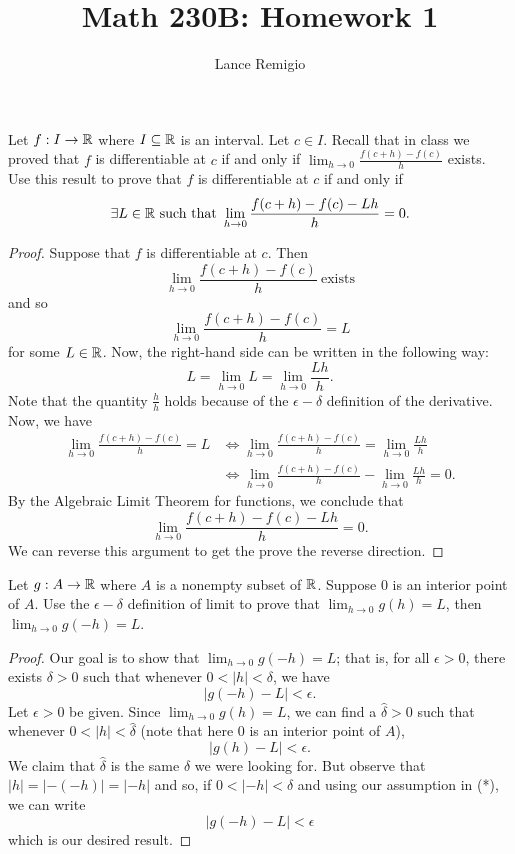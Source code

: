 \documentclass[a4paper]{article}
\title{Math 230B: Homework 1}
\author{Lance Remigio}
\begin{document}
\maketitle

\begin{problem}
   Let \( f: I \to \mathbb{R}  \) where \( I \subseteq  \mathbb{R}   \) is an interval. Let \( c \in I  \). Recall that in class we proved that \( f  \) is differentiable at \( c  \) if and only if \( \displaystyle \lim_{ h \to 0 } \frac{ f(c+h)  - f(c) }{ h }  \) exists. Use this result to prove that \( f  \) is differentiable at \( c  \) if and only if  
   \[  \exists L \in \R \ \text{such that} \ \lim_{ h \to 0 } \frac{ f(c+h) - f(c) - Lh }{ h } = 0. \]
\end{problem}
\begin{proof}
Suppose that \( f  \) is differentiable at \( c  \). Then
\[  \lim_{ h \to 0 }  \frac{ f(c+h) - f(c) }{ h  } \ \text{exists}    \]
and so 
\[  \lim_{ h \to 0 }  \frac{ f(c+h) - f(c) }{ h  } = L  \]
for some \( L \in \mathbb{R}  \). Now, the right-hand side can be written in the following way:
\[  L = \lim_{ h \to 0 }  L = \lim_{ h \to 0 }   \frac{ L h }{ h }.  \]
Note that the quantity \( \frac{ h }{ h }  \) holds because of the \( \epsilon-\delta \) definition of the derivative. Now, we have 
\begin{align*}
    \lim_{ h \to 0 }  \frac{ f(c+h) - f(c) }{ h   } = L  &\iff \lim_{ h \to 0 }  \frac{ f(c+h) - f(c) }{ h  } = \lim_{ h \to 0 } \frac{L h }{ h }  \\
                                                         &\iff \lim_{ h \to 0 }  \frac{ f(c+h) - f(c) }{ h }  - \lim_{ h \to 0 } \frac{ Lh  }{ h } = 0.
\end{align*}
By the Algebraic Limit Theorem for functions, we conclude that 
\[  \lim_{ h \to 0 } \frac{ f(c+h) - f(c) - Lh }{ h } = 0. \]
We can reverse this argument to get the prove the reverse direction.
\end{proof}

\begin{problem}
    Let \( g: A \to \mathbb{R}  \) where \( A  \) is a nonempty subset of \( \mathbb{R}  \). Suppose \( 0  \) is an interior point of \( A  \). Use the \( \epsilon-\delta \) definition of limit to prove that \( \lim_{ h \to 0 }  g(h) = L  \), then \( \lim_{ h \to 0 }  g(-h) = L  \). 
\end{problem}
\begin{proof}
Our goal is to show that \( \lim_{ h \to 0 }  g(-h) = L \); that is, for all \( \epsilon > 0  \), there exists \( \delta > 0  \) such that whenever \( 0 < | h  |  < \delta \), we have 
\[  | g(-h) - L  |  < \epsilon. \]
Let \( \epsilon > 0  \) be given. Since \( \lim_{ h \to 0 } g(h) = L  \), we can find a \( \hat{\delta} > 0  \) such that whenever \( 0 < | h  |  < \hat{\delta} \) (note that here \( 0  \) is an interior point of \( A  \)), 
\[  | g(h) - L  | < \epsilon. \tag{*}  \]
We claim that \( \hat{\delta} \) is the same \( \delta  \) we were looking for. But observe that \( | h  |  = | -(-h) | = | -h  |  \) and so, if \( 0 < | -h  |  < \delta \) and using our assumption in (*), we can write
\[  | g(-h) - L  | < \epsilon \]
which is our desired result.
\end{proof}
\end{document}
